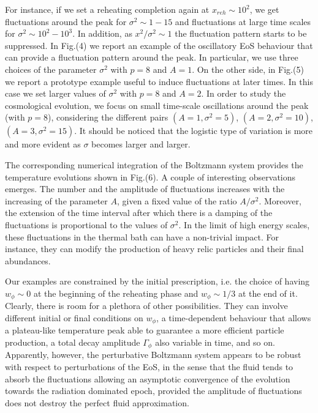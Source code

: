 \documentclass[%
aps,prd,nofootinbib,showkeys,a4paper,10pt
]{revtex4-2}
\begin{document}
For instance, if we set a reheating completion again at $x_{reh}\sim 10^2$, 
we get fluctuations around the peak for $\sigma^2\sim 1-15$ and fluctuations at large time scales for $\sigma^2\sim 10^2-10^3$.
In addition, as $x^2/\sigma^2\sim 1$ the fluctuation pattern starts to be suppressed.
In Fig.(4) we report an example of the oscillatory EoS behaviour that can provide a fluctuation pattern around the peak.
In particular, we use three choices of the parameter $\sigma^2$ with $p=8$ and $A=1$.
On the other side, in Fig.(5) we report a prototype example useful to induce fluctuations at later times.
In this case we set larger values of $\sigma^2$ with $p=8$ and $A=2$.
In order to study the cosmological evolution, we focus on small time-scale oscillations around the peak (with $p=8$), 
considering the different pairs $(A=1,\sigma^2=5)$, $(A=2,\sigma^2=10)$, $(A=3,\sigma^2=15)$. 
It should be noticed that the logistic type of variation is more and more evident as $\sigma$ becomes larger and larger. 

The corresponding numerical integration of the Boltzmann system provides the temperature evolutions shown in Fig.(6).  
A couple of interesting observations emerges.  
The number and the amplitude of fluctuations increases with the increasing of the
parameter $A$, given a fixed value of the ratio $A/\sigma^2$. 
Moreover, the extension of the time interval after which there is a damping of the fluctuations is proportional to the values of $\sigma^2$.  
In the limit of high energy scales, these fluctuations in the thermal bath can have a non-trivial impact. 
For instance, they can modify the production of heavy relic particles and their final abundances.

Our examples are constrained by the initial prescription, i.e. the choice of having $w_{\phi}\sim 0$
at the beginning of the reheating phase and $w_{\phi}\sim 1/3$ at the end of it.  
Clearly, there is room for a plethora of other possibilities. 
They can involve different initial or final conditions on $w_{\phi}$, 
a time-dependent behaviour that allows a plateau-like temperature peak able to guarantee a more efficient particle production, 
a total decay amplitude $\Gamma_{\phi}$ also variable in time, and so on.
Apparently, however, the perturbative Boltzmann system appears to be robust with respect to perturbations of the EoS, 
in the sense that the fluid tends to absorb the fluctuations allowing an asymptotic convergence of the evolution towards the radiation dominated epoch,
provided the amplitude of fluctuations does not destroy the perfect fluid approximation.
\end{document}
